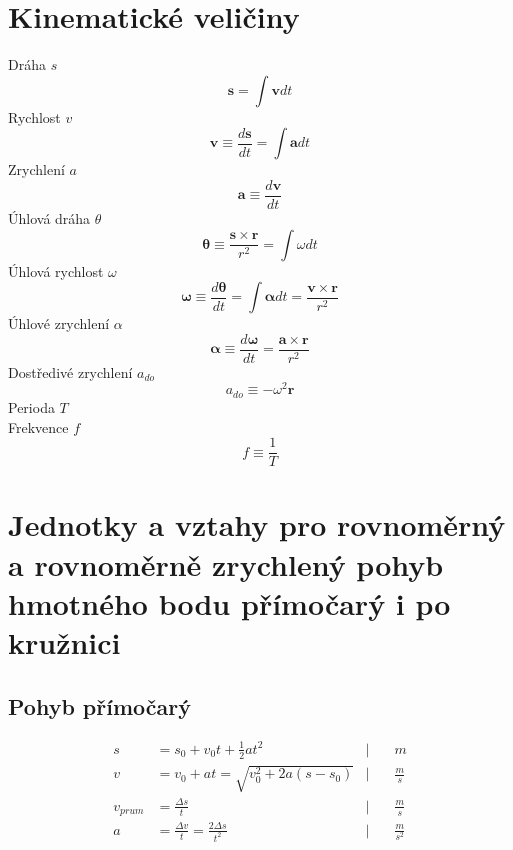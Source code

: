 \documentclass[titlepage]{report}
\begin{document}
\section{Kinematické veličiny}
Dráha $s$\\
\begin{equation}
\boldsymbol s = \int \boldsymbol v dt
\end{equation}
Rychlost $v$\\
\begin{equation}
\boldsymbol v \equiv \frac{d\boldsymbol s}{dt} = \int \boldsymbol a dt
\end{equation}
Zrychlení $a$\\
\begin{equation}
\boldsymbol a \equiv \frac{d\boldsymbol v}{dt}
\end{equation}
Úhlová dráha $\theta$\\
\begin{equation}
\boldsymbol \theta \equiv \frac{\boldsymbol s \times \boldsymbol r}{r^2} = \int \omega dt
\end{equation}
Úhlová rychlost $\omega$\\
\begin{equation}
\boldsymbol \omega \equiv \frac{d\boldsymbol \theta}{dt} = \int \boldsymbol \alpha dt = \frac{\boldsymbol v \times \boldsymbol r}{r^2}
\end{equation}
Úhlové zrychlení $\alpha$\\
\begin{equation}
\boldsymbol \alpha \equiv \frac{d\boldsymbol \omega}{dt} = \frac{\boldsymbol a \times \boldsymbol r}{r^2}
\end{equation}
Dostředivé zrychlení $a_{do}$\\
\begin{equation}
a_{do} \equiv -\omega^2 \boldsymbol r
\end{equation}
Perioda $T$\\
Frekvence $f$\\
\begin{equation}
f \equiv \frac{1}{T}
\end{equation}
\section{Jednotky a vztahy pro rovnoměrný a rovnoměrně zrychlený pohyb hmotného bodu přímočarý i po kružnici}
\subsection{Pohyb přímočarý}
\begin{align}
s &= s_0+v_0t+\frac{1}{2}at^2                            &  \Big| \quad &m\\
v &= v_0+at = \sqrt{v_0^2 + 2a(s-s_0)}                   &  \Big| \quad &\frac{m}{s}\\
v_{prum} &= \frac{\Delta s}{t}                           &  \Big| \quad &\frac{m}{s}\\
a &= \frac{\Delta v}{t} = \frac{2\Delta s}{t^2}          &  \Big| \quad &\frac{m}{s^2}
\end{align}
\end{document}
